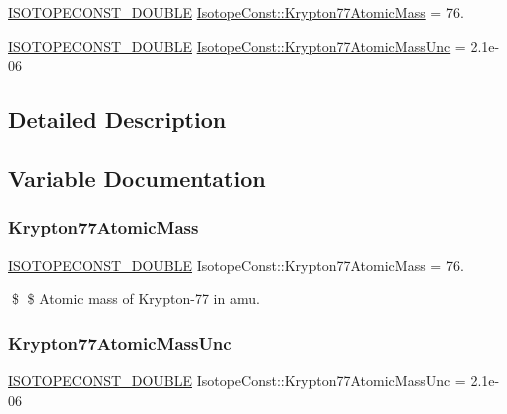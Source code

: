 \begin{DoxyCompactItemize}
\item 
\mbox{\hyperlink{group___isotope_const-_macros_ga8f45a7272ce02c0b4c65c44636ed719a}{I\+S\+O\+T\+O\+P\+E\+C\+O\+N\+S\+T\+\_\+\+D\+O\+U\+B\+LE}} \mbox{\hyperlink{group___isotope_const-_krypton-_kr77_ga9b1fe8e746f9c98048160be54a2c4c33}{Isotope\+Const\+::\+Krypton77\+Atomic\+Mass}} = 76.
\item 
\mbox{\hyperlink{group___isotope_const-_macros_ga8f45a7272ce02c0b4c65c44636ed719a}{I\+S\+O\+T\+O\+P\+E\+C\+O\+N\+S\+T\+\_\+\+D\+O\+U\+B\+LE}} \mbox{\hyperlink{group___isotope_const-_krypton-_kr77_gacf7870de01334bddbb346c7a3ddad5dd}{Isotope\+Const\+::\+Krypton77\+Atomic\+Mass\+Unc}} = 2.\+1e-\/06
\end{DoxyCompactItemize}


\subsection{Detailed Description}


\subsection{Variable Documentation}
\mbox{\label{group___isotope_const-_krypton-_kr77_ga9b1fe8e746f9c98048160be54a2c4c33}} 
\subsubsection{\texorpdfstring{Krypton77\+Atomic\+Mass}{Krypton77AtomicMass}}
{\footnotesize\ttfamily \mbox{\hyperlink{group___isotope_const-_macros_ga8f45a7272ce02c0b4c65c44636ed719a}{I\+S\+O\+T\+O\+P\+E\+C\+O\+N\+S\+T\+\_\+\+D\+O\+U\+B\+LE}} Isotope\+Const\+::\+Krypton77\+Atomic\+Mass = 76.}

\$ \$ Atomic mass of Krypton-\/77 in amu. \mbox{\label{group___isotope_const-_krypton-_kr77_gacf7870de01334bddbb346c7a3ddad5dd}} 
\subsubsection{\texorpdfstring{Krypton77\+Atomic\+Mass\+Unc}{Krypton77AtomicMassUnc}}
{\footnotesize\ttfamily \mbox{\hyperlink{group___isotope_const-_macros_ga8f45a7272ce02c0b4c65c44636ed719a}{I\+S\+O\+T\+O\+P\+E\+C\+O\+N\+S\+T\+\_\+\+D\+O\+U\+B\+LE}} Isotope\+Const\+::\+Krypton77\+Atomic\+Mass\+Unc = 2.\+1e-\/06}

